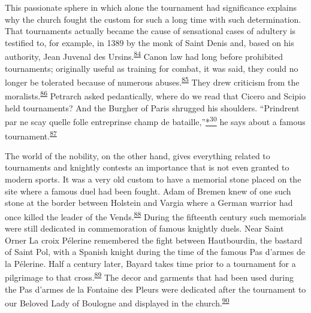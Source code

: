 This passionate sphere in which alone the tournament had significance
explains why the church fought the custom for such a long time with such
determination. That tournaments actually became the cause of sensational
cases of adultery is testified to, for example, in 1389 by the monk of
Saint Denis and, based on his authority, Jean Juvenal des
Ursins.\textsuperscript{\protect\hypertarget{10_Chapter_Three__THE_HEROIC_DREAM.xhtmlux5cux23id_1766}{\protect\hyperlink{23_NOTES.xhtmlux5cux23id_1767}{84}}}
Canon law had long before prohibited tournaments; originally useful as
training for combat, it was said, they could no longer be tolerated
because of numerous
abuses.\textsuperscript{\protect\hypertarget{10_Chapter_Three__THE_HEROIC_DREAM.xhtmlux5cux23id_1764}{\protect\hyperlink{23_NOTES.xhtmlux5cux23id_1765}{85}}}
They drew criticism from the
moralists.\textsuperscript{\protect\hypertarget{10_Chapter_Three__THE_HEROIC_DREAM.xhtmlux5cux23id_1762}{\protect\hyperlink{23_NOTES.xhtmlux5cux23id_1763}{86}}}
Petrarch asked pedantically, where do we read that Cicero and Scipio
held
tourna\protect\hypertarget{10_Chapter_Three__THE_HEROIC_DREAM.xhtmlux5cux23page_89}{}{}ments?
And the Burgher of Paris shrugged his shoulders. ``Prindrent par ne scay
quelle folle entreprinse champ de
bataille,''\protect\hypertarget{10_Chapter_Three__THE_HEROIC_DREAM.xhtmlux5cux23id_2521}{\protect\hyperlink{23_NOTES.xhtmlux5cux23id_2522}{*\textsuperscript{30}}}
he says about a famous
tournament.\textsuperscript{\protect\hypertarget{10_Chapter_Three__THE_HEROIC_DREAM.xhtmlux5cux23id_1760}{\protect\hyperlink{23_NOTES.xhtmlux5cux23id_1761}{87}}}

The world of the nobility, on the other hand, gives everything related
to tournaments and knightly contests an importance that is not even
granted to modern sports. It was a very old custom to have a memorial
stone placed on the site where a famous duel had been fought. Adam of
Bremen knew of one such stone at the border between Holstein and Vargia
where a German warrior had once killed the leader of the
Vends.\textsuperscript{\protect\hypertarget{10_Chapter_Three__THE_HEROIC_DREAM.xhtmlux5cux23id_1758}{\protect\hyperlink{23_NOTES.xhtmlux5cux23id_1759}{88}}}
During the fifteenth century such memorials were still dedicated in
commemoration of famous knightly duels. Near Saint Orner La croix
Pélerine remembered the fight between Hautbourdin, the bastard of Saint
Pol, with a Spanish knight during the time of the famous Pas d'armes de
la Pélerine. Half a century later, Bayard takes time prior to a
tournament for a pilgrimage to that
cross.\textsuperscript{\protect\hypertarget{10_Chapter_Three__THE_HEROIC_DREAM.xhtmlux5cux23id_1756}{\protect\hyperlink{23_NOTES.xhtmlux5cux23id_1757}{89}}}
The decor and garments that had been used during the Pas d'armes de la
Fontaine des Pleurs were dedicated after the tournament to our Beloved
Lady of Boulogne and displayed in the
church.\textsuperscript{\protect\hypertarget{10_Chapter_Three__THE_HEROIC_DREAM.xhtmlux5cux23id_1754}{\protect\hyperlink{23_NOTES.xhtmlux5cux23id_1755}{90}}}

